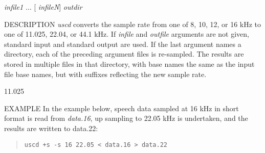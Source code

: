 \begin{synopsis}
\item [uscd] [ --s $S$ $S$] [ +{\em type} ] [ {\em infile} ] [ {\em outfile} ]
\item [uscd] [ --s $S$ $S$] [ +{\em type} ] {\em infile1} $\dots$ [ {\em infileN}] {\em outdir} 
\end{synopsis}

\begin{qsection}{DESCRIPTION}
{\em uscd} converts the sample rate from one of 8, 10, 12, or 16 kHz 
to one of 11.025, 22.04, or 44.1 kHz.
If {\em infile} and {\em outfile} arguments are not given, 
standard input and standard output are used.
If the last argument names a directory, 
each of the preceding argument files is re-sampled. 
The results are stored in multiple files in that directory, 
with base names the same as the input file base names, 
but with suffixes reflecting the new sample rate.
\end{qsection}

\begin{options}
		{11.025}
\end{options}

\begin{qsection}{EXAMPLE}
In the example below, speech data sampled at 16 kHz in short format
is read from {\em data.16}, up sampling to 22.05 kHz is undertaken,
and the results are written to {data.22}:
\begin{quote}
\verb!uscd +s -s 16 22.05 < data.16 > data.22!
\end{quote}
\end{qsection}



